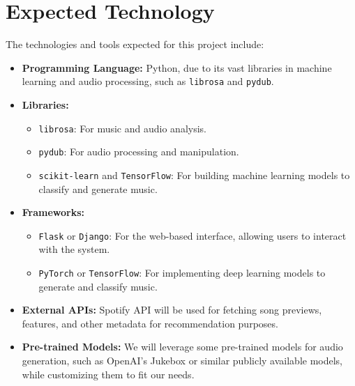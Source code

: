 \documentclass{article}
\begin{document}
\section{Expected Technology}

The technologies and tools expected for this project include:

\begin{itemize}
    \item \textbf{Programming Language:} Python, due to its vast libraries in machine learning and audio processing, such as \texttt{librosa} and \texttt{pydub}.
    \item \textbf{Libraries:} 
        \begin{itemize}
            \item \texttt{librosa}: For music and audio analysis.
            \item \texttt{pydub}: For audio processing and manipulation.
            \item \texttt{scikit-learn} and \texttt{TensorFlow}: For building machine learning models to classify and generate music.
        \end{itemize}
    \item \textbf{Frameworks:} 
        \begin{itemize}
            \item \texttt{Flask} or \texttt{Django}: For the web-based interface, allowing users to interact with the system.
            \item \texttt{PyTorch} or \texttt{TensorFlow}: For implementing deep learning models to generate and classify music.
        \end{itemize}
    \item \textbf{External APIs:} Spotify API will be used for fetching song previews, features, and other metadata for recommendation purposes.
    \item \textbf{Pre-trained Models:} We will leverage some pre-trained models for audio generation, such as OpenAI's Jukebox or similar publicly available models, while customizing them to fit our needs.
\end{itemize}


\end{document}
